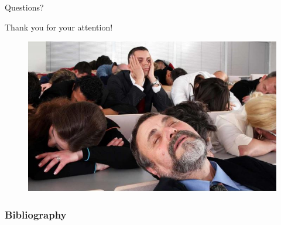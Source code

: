 \documentclass[aspectratio=169]{beamer}
\begin{document}
\begin{frame}
\Huge{\centerline{Questions?}}
\end{frame}
\begin{frame}
\Huge{\centerline{Thank you for your attention!}}
\begin{center}
    \begin{figure}
        \includegraphics[scale=0.5]{./images/attention.JPG}
    \end{figure}
\end{center}
\end{frame}


\begin{frame}[t, allowframebreaks]
\frametitle{Bibliography}


\end{frame}
\end{document}
